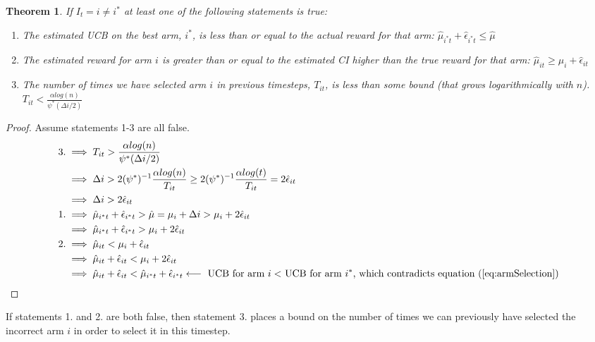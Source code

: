 \documentclass{article}
\newcommand{\eq}[1]{\begin{align*}#1\end{align*}}
\theoremstyle{plain}
\newtheorem{theorem}{Theorem}
\theoremstyle{definition}
\begin{document}
\begin{theorem} If $I_t = i \neq i^*$ at least one of the following statements is true:
\begin{enumerate}
\item The estimated UCB on the best arm, $i^*$, is less than or equal to the actual reward for that arm: $\hat{\mu}_{i^*t} + \hat{\epsilon}_{i^*t} \leq \hat \mu$
\item The estimated reward for arm $i$ is greater than or equal to the estimated CI higher than the true reward for that arm: $\hat \mu_{it} \geq \mu_i + \hat \epsilon_{it}$
\item The number of times we have selected arm $i$ in previous timesteps, $T_{it}$, is less than some bound (that grows logarithmically with $n$). $T_{it} < \frac{\alpha log(n)}{\psi^*(\Delta i/2)}$
\end{enumerate}
\end{theorem}
\begin{proof}
Assume statements 1-3 are all false.
\eq {
3. & \implies T_{it} > \frac{\alpha log(n)}{\psi^*(\Delta i/2)} \\
  & \implies \Delta i > 2 (\psi^*)^{-1} \frac{\alpha log(n)}{T_{it}} \geq 2 (\psi^*)^{-1} \frac{\alpha log(t)}{T_{it}} = 2 \hat \epsilon_{it}\\
  & \implies \Delta i > 2 \hat \epsilon_{it} \\
1. & \implies \hat{\mu}_{i^*t} + \hat{\epsilon}_{i^*t}  > \hat \mu  = \mu_i+\Delta i > \mu_i +  2 \hat \epsilon_{it}\\
& \implies \hat{\mu}_{i^*t} + \hat{\epsilon}_{i^*t}  > \mu_i +  2 \hat \epsilon_{it}\\
2. & \implies \hat \mu_{it} < \mu_i + \hat \epsilon_{it} \\
   & \implies \hat \mu_{it} + \hat \epsilon_{it} < \mu_i +2 \hat \epsilon_{it} \\
   & \implies \hat \mu_{it} + \hat \epsilon_{it} <  \hat{\mu}_{i^*t} + \hat{\epsilon}_{i^*t} \longleftarrow \text { UCB for arm $i < $ UCB for arm $i^*$, which contradicts equation (\ref{eq:armSelection}})
}

\end{proof}

If statements 1. and 2. are both false, then statement 3. places a bound on the number of times we can previously have selected the incorrect arm $i$ in order to select it in this timestep. 
\end{document}
